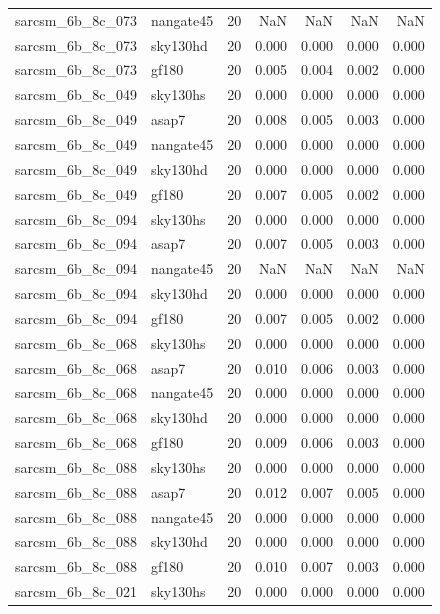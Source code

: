 \begin{tabular}{llrrrrr}
sarcsm\_6b\_8c\_073 & nangate45 & 20 & NaN & NaN & NaN & NaN \\
sarcsm\_6b\_8c\_073 & sky130hd & 20 & 0.000 & 0.000 & 0.000 & 0.000 \\
sarcsm\_6b\_8c\_073 & gf180 & 20 & 0.005 & 0.004 & 0.002 & 0.000 \\
sarcsm\_6b\_8c\_049 & sky130hs & 20 & 0.000 & 0.000 & 0.000 & 0.000 \\
sarcsm\_6b\_8c\_049 & asap7 & 20 & 0.008 & 0.005 & 0.003 & 0.000 \\
sarcsm\_6b\_8c\_049 & nangate45 & 20 & 0.000 & 0.000 & 0.000 & 0.000 \\
sarcsm\_6b\_8c\_049 & sky130hd & 20 & 0.000 & 0.000 & 0.000 & 0.000 \\
sarcsm\_6b\_8c\_049 & gf180 & 20 & 0.007 & 0.005 & 0.002 & 0.000 \\
sarcsm\_6b\_8c\_094 & sky130hs & 20 & 0.000 & 0.000 & 0.000 & 0.000 \\
sarcsm\_6b\_8c\_094 & asap7 & 20 & 0.007 & 0.005 & 0.003 & 0.000 \\
sarcsm\_6b\_8c\_094 & nangate45 & 20 & NaN & NaN & NaN & NaN \\
sarcsm\_6b\_8c\_094 & sky130hd & 20 & 0.000 & 0.000 & 0.000 & 0.000 \\
sarcsm\_6b\_8c\_094 & gf180 & 20 & 0.007 & 0.005 & 0.002 & 0.000 \\
sarcsm\_6b\_8c\_068 & sky130hs & 20 & 0.000 & 0.000 & 0.000 & 0.000 \\
sarcsm\_6b\_8c\_068 & asap7 & 20 & 0.010 & 0.006 & 0.003 & 0.000 \\
sarcsm\_6b\_8c\_068 & nangate45 & 20 & 0.000 & 0.000 & 0.000 & 0.000 \\
sarcsm\_6b\_8c\_068 & sky130hd & 20 & 0.000 & 0.000 & 0.000 & 0.000 \\
sarcsm\_6b\_8c\_068 & gf180 & 20 & 0.009 & 0.006 & 0.003 & 0.000 \\
sarcsm\_6b\_8c\_088 & sky130hs & 20 & 0.000 & 0.000 & 0.000 & 0.000 \\
sarcsm\_6b\_8c\_088 & asap7 & 20 & 0.012 & 0.007 & 0.005 & 0.000 \\
sarcsm\_6b\_8c\_088 & nangate45 & 20 & 0.000 & 0.000 & 0.000 & 0.000 \\
sarcsm\_6b\_8c\_088 & sky130hd & 20 & 0.000 & 0.000 & 0.000 & 0.000 \\
sarcsm\_6b\_8c\_088 & gf180 & 20 & 0.010 & 0.007 & 0.003 & 0.000 \\
sarcsm\_6b\_8c\_021 & sky130hs & 20 & 0.000 & 0.000 & 0.000 & 0.000 \\

\end{tabular}

